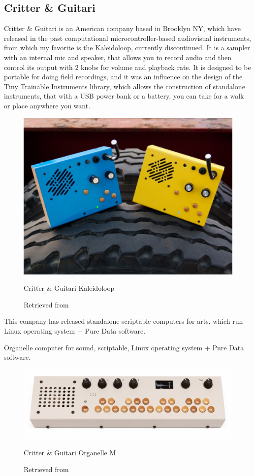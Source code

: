 \subsection{Critter \& Guitari}

Critter \& Guitari is an American company based in Brooklyn NY, which have released in the past computational microcontroller-based audiovisual instruments, from which my favorite is the Kaleidoloop, currently discontinued. It is a sampler with an internal mic and speaker, that allows you to record audio and then control its output with 2 knobs for volume and playback rate. It is designed to be portable for doing field recordings, and it was an influence on the design of the Tiny Trainable Instruments library, which allows the construction of standalone instruments, that with a USB power bank or a battery, you can take for a walk or place anywhere you want.

\begin{figure}[ht]
  \centering
  \includegraphics[width=0.75\linewidth,height=0.25\textheight,keepaspectratio]{images/critter-and-guitari-kaleidoloop.jpg}
  \caption{Critter \& Guitari Kaleidoloop}
  \caption*{Retrieved from \cite{website-critter-and-guitari-kaleidoloop}}
  \label{fig:critter-and-guitari-kaleidoloop}
\end{figure}

This company has released standalone scriptable computers for arts, which run Linux operating system + Pure Data software.

Organelle computer for sound, scriptable, Linux operating system + Pure Data software.

\begin{figure}[ht]
  \centering
  \includegraphics[width=0.75\linewidth,height=0.25\textheight,keepaspectratio]{images/critter-and-guitari-organelle-m.jpg}
  \caption{Critter \& Guitari Organelle M}
  \caption*{Retrieved from \cite{website-critter-and-guitari-current}}
  \label{fig:critter-and-guitari-organelle-m}
\end{figure}

